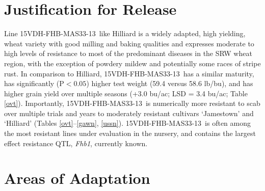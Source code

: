 \documentclass[12pt, letterpaper]{article}
\newcommand{\lin}{15VDH-FHB-MAS33-13~}
\begin{document}

\section{Justification for Release}

Line \lin like Hilliard is a widely adapted, high yielding, wheat variety with good milling and baking qualities and expresses moderate to high levels of resistance to most of the predominant diseases in the SRW wheat region, with the exception of powdery mildew and potentially some races of stripe rust. In comparison to Hilliard, \lin has a similar maturity, has significantly (P$<0.05$) higher test weight (59.4 versus 58.6 lb/bu), and has higher grain yield over multiple seasons (+3.0 bu/ac; LSD = 3.4 bu/ac; Table \ref{ovt}). Importantly, \lin is numerically more resistant to scab over multiple trials and years to moderately resistant cultivars `Jamestown' and `Hilliard' (Tables \ref{ovt}--\ref{gawn}, \ref{ussn}). \lin is often among the most resistant lines under evaluation in the nursery, and contains the largest effect resistance QTL, \textit{Fhb1}, currently known.  

\section{Areas of Adaptation}
 
\end{document}
